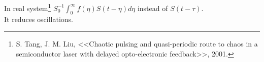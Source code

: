 In real system\footnote{
    S. Tang, J. M. Liu, <<Chaotic pulsing and quasi-periodic route to chaos in a semiconductor laser with delayed opto-electronic feedback>>, 2001.
}  $S_0^{-1} \int_{0}^{\infty} f(\eta) S(t-\eta)d\eta$ instead of $S(t-\tau)$. \\
 It reduces oscillations.
